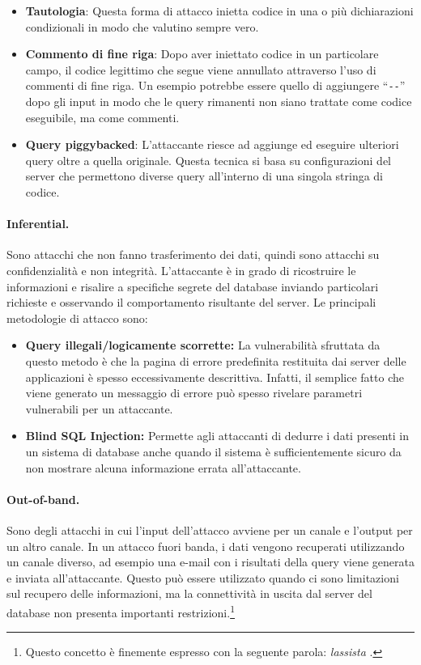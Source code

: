\begin{itemize}
    \item \textbf{Tautologia}: Questa forma di attacco inietta codice in una o
          più dichiarazioni condizionali in modo che valutino sempre vero.
    \item \textbf{Commento di fine riga}: Dopo aver iniettato codice in un
          particolare campo, il codice legittimo che segue viene annullato
          attraverso l'uso di commenti di fine riga. Un esempio potrebbe
          essere quello di aggiungere ``\verb|--|'' dopo gli input in modo che
          le query rimanenti non siano trattate come codice eseguibile, ma come
          commenti.
    \item \textbf{Query piggybacked}: L'attaccante riesce ad aggiunge ed
          eseguire ulteriori query oltre a quella originale. Questa
          tecnica si basa su configurazioni del server che permettono diverse
          query all'interno di una singola stringa di codice.
\end{itemize}

\paragraph{Inferential.}
Sono attacchi che non fanno trasferimento dei dati, quindi sono attacchi su
confidenzialità e non integrità. L'attaccante è in
grado di ricostruire le informazioni e risalire a specifiche segrete del database
inviando particolari richieste
e osservando il comportamento risultante del server.
Le principali metodologie di attacco sono:
\begin{itemize}
    \item \textbf{Query illegali/logicamente scorrette:} La vulnerabilità
          sfruttata da questo metodo è che la pagina di errore
          predefinita restituita dai server delle applicazioni è
          spesso eccessivamente descrittiva. Infatti, il semplice
          fatto che viene generato un messaggio di errore può
          spesso rivelare parametri vulnerabili per un
          attaccante.

    \item \textbf{Blind SQL Injection:} Permette agli attaccanti di dedurre i
          dati presenti in un sistema di database anche quando il sistema è
          sufficientemente sicuro da non mostrare alcuna informazione errata
          all'attaccante.
\end{itemize}

\paragraph*{Out-of-band.}
Sono degli attacchi in cui l'input dell'attacco avviene per un canale e l'output
per un altro canale. In un attacco fuori banda, i dati vengono recuperati
utilizzando un canale diverso, ad esempio una e-mail con i risultati della query
viene generata e inviata all'attaccante. Questo può essere utilizzato quando ci
sono limitazioni sul recupero delle informazioni, ma la connettività in uscita
dal server del database non presenta importanti restrizioni.\footnote{Questo
    concetto è finemente espresso con la seguente parola: \textit{lassista}
    .}
